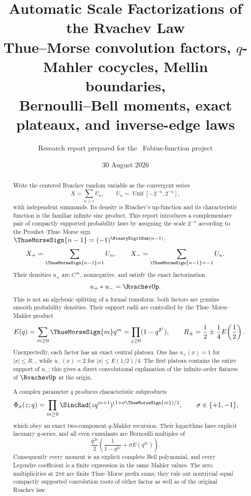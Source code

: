 \documentclass[11pt,oneside]{article}
\title{\bfseries Automatic Scale Factorizations of the Rvachev Law\\[0.35em]
\large Thue--Morse convolution factors, $q$-Mahler cocycles, Mellin boundaries,\\
Bernoulli--Bell moments, exact plateaux, and inverse-edge laws}
\author{Research report prepared for the \repo\ Fabius-function project}
\date{30 August 2026}
\numberwithin{equation}{section}
\theoremstyle{definition}
\theoremstyle{remark}
\begin{document}
\maketitle

\begin{abstract}
Write the centered Rvachev random variable as the convergent series
\[
 X=\sum_{n\ge1}U_n,\qquad U_n\sim\operatorname{Unif}[-2^{-n},2^{-n}],
\]
with independent summands.  Its density is Rvachev's up-function and its characteristic
function is the familiar infinite sinc product.  This report introduces a complementary
pair of compactly supported probability laws by assigning the scale $2^{-n}$ according
to the Prouhet--Thue--Morse sign $\ThueMorseSign{n-1}=(-1)^{\BinaryDigitSum(n-1)}$:
\[
 X_+=\sum_{\ThueMorseSign{n-1}=1}U_n,
 \qquad
 X_-=\sum_{\ThueMorseSign{n-1}=-1}U_n.
\]
Their densities $u_\pm$ are $C^\infty$, nonnegative, and satisfy the exact factorization
\[
 u_+*u_-=\RvachevUp.
\]
This is not an algebraic splitting of a formal transform: both factors are genuine smooth
probability densities.  Their support radii are controlled by the Thue--Morse--Mahler
product
\[
 E(q)=\sum_{m\ge0}\ThueMorseSign{m}q^m=\prod_{j\ge0}(1-q^{2^j}),
\qquad
 R_\pm=\frac12\pm\frac14E\!\left(\frac12\right).
\]
Unexpectedly, each factor has an exact central plateau.  One has
$u_+(x)=1$ for $|x|\le R_-$, while
$u_-(x)=2$ for $|x|\le E(1/2)/4$.  The first plateau contains the entire support of
$u_-$; this gives a direct convolutional explanation of the infinite-order flatness of
$\RvachevUp$ at the origin.

A complex parameter $q$ produces characteristic subproducts
\[
 \Phi_\sigma(z;q)=\prod_{m\ge0}
 \SincRad(zq^{m+1})^{(1+\sigma\ThueMorseSign{m})/2},\qquad \sigma\in\{+1,-1\},
\]
which obey an exact two-component $q$-Mahler recursion.  Their logarithms have explicit
lacunary $q$-series, and all even cumulants are Bernoulli multiples of
\[
 \frac{q^{2r}}2\left(\frac1{1-q^{2r}}+\sigma E(q^{2r})\right).
\]
Consequently every moment is an explicit complete Bell polynomial, and every Legendre
coefficient is a finite expression in the same Mahler values.  The zero multiplicities
at $2\pi k$ are finite Thue--Morse prefix sums; they rule out nontrivial equal compactly
supported convolution roots of either factor as well as of the original Rvachev law.


\end{abstract}
\end{document}
